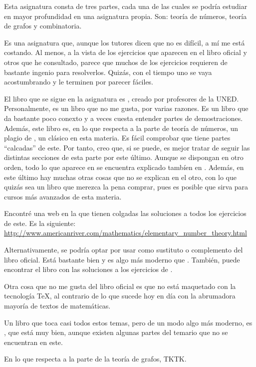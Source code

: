 


Esta asignatura consta de tres partes, cada una de las cuales se podría
estudiar en mayor profundidad en una asignatura propia. Son: teoría de
números, teoría de grafos y combinatoria.

Es una asignatura que, aunque los tutores dicen que no es difícil, a mí me
está costando. Al menos, a la vista de los ejercicios que aparecen en el
libro oficial y otros que he consultado, parece que muchos de los ejercicios
requieren de bastante ingenio para resolverlos. Quizás, con el tiempo uno se
vaya acostumbrando y le terminen por parecer fáciles.

El libro que se sigue en la asignatura es \cite{texto-uned}, creado
por profesores de la UNED. Personalmente, es un libro que no me gusta, por
varias razones. Es un libro que da bastante poco conexto y a veces cuesta
entender partes de demostraciones. Además, este libro es, en lo que respecta
a la parte de teoría de números, un plagio de \cite{burton},
un clásico en esta materia. Es fácil comprobar que tiene partes ``calcadas''
de este. Por tanto, creo que, si se puede, es mejor tratar de seguir las
distintas secciones de esta parte por este último. Aunque se dispongan en
otro orden, todo lo que aparece en \cite{texto-uned} se encuentra
explicado tambíen en \cite{burton}. Además, en este último hay
muchas otras cosas que no se explican en el otro, con lo que quizás sea un
libro que merezca la pena comprar, pues es posible que sirva para cursos más
avanzados de esta materia.

Encontré una web en la que tienen colgadas las soluciones a todos los
ejercicios de este. Es la siguiente:
\url{http://www.americanriver.com/mathematics/elementary_number_theory.html}

Alternativamente, se podría optar por usar \cite{rosen} como
sustituto o complemento del libro oficial. Está bastante bien y es algo más
moderno que \cite{burton}. También, puede encontrar el libro
con las soluciones a los ejercicios de \cite{rosen}.

Otra cosa que no me gusta del libro oficial es que no está maquetado con la
tecnología TeX, al contrario de lo que sucede hoy en día con la abrumadora
mayoría de textos de matemáticas.

Un libro que toca casi todos estos temas, pero de un modo algo más moderno,
es \cite{weissman}, que está muy bien, aunque existen algunas
partes del temario que no se encuentran en este.

En lo que respecta a la parte de la teoría de grafos, TKTK.

